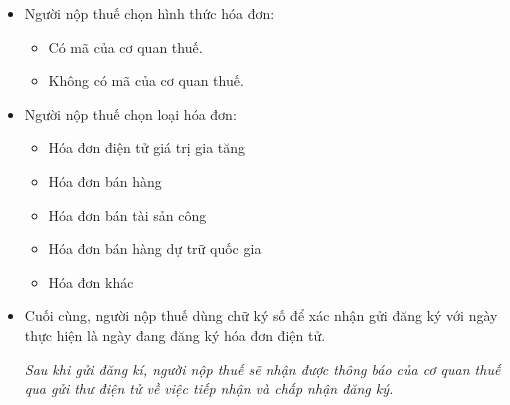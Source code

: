 \begin{itemize}
\begin{itemize}
\begin{itemize}
                        \item Người nộp thuế chọn hình thức hóa đơn:

                              \begin{itemize}

                                  \item Có mã của cơ quan thuế.

                                  \item Không có mã của cơ quan thuế.

                              \end{itemize}

                        \item Người nộp thuế chọn loại hóa đơn:

                              \begin{itemize}

                                  \item Hóa đơn điện tử giá trị gia tăng

                                  \item Hóa đơn bán hàng

                                  \item Hóa đơn bán tài sản công

                                  \item Hóa đơn bán hàng dự trữ quốc gia

                                  \item Hóa đơn khác

                              \end{itemize}

                        \item Cuối cùng, người nộp thuế dùng chữ ký số để xác nhận gửi đăng ký với ngày thực hiện là ngày đang đăng ký hóa đơn điện tử.


                      
                        \emph{Sau khi gửi đăng kí, người nộp thuế sẽ nhận được thông báo của         cơ quan thuế      qua gửi thư điện tử về việc tiếp nhận và chấp nhận đăng ký.}
                    \end{itemize}

          \end{itemize}

\end{itemize}

